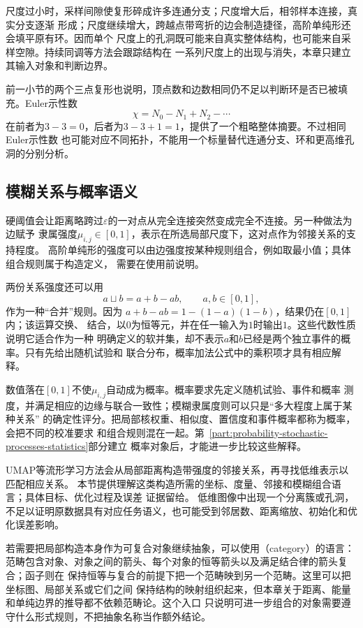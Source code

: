 尺度过小时，采样间隙使复形碎成许多连通分支；尺度增大后，相邻样本连接，真实分支逐渐
形成；尺度继续增大，跨越点带弯折的边会制造捷径，高阶单纯形还会填平原有环。因而单个
尺度上的孔洞既可能来自真实整体结构，也可能来自采样空隙。持续同调等方法会跟踪结构在
一系列尺度上的出现与消失，本章只建立其输入对象和判断边界。

前一小节的两个三点复形也说明，顶点数和边数相同仍不足以判断环是否已被填充。Euler示性数
\[
  \chi
  =
  N_0-N_1+N_2-\cdots
\]
在前者为$3-3=0$，后者为$3-3+1=1$，提供了一个粗略整体摘要。不过相同Euler示性数
也可能对应不同拓扑，不能用一个标量替代连通分支、环和更高维孔洞的分别分析。

\subsection{模糊关系与概率语义}

硬阈值会让距离略跨过$\varepsilon$的一对点从完全连接突然变成完全不连接。另一种做法为边赋予
隶属强度$\mu_{i,j}\in[0,1]$，表示在所选局部尺度下，这对点作为邻接关系的支持程度。
高阶单纯形的强度可以由边强度按某种规则组合，例如取最小值；具体组合规则属于构造定义，
需要在使用前说明。

两份关系强度还可以用
\begin{equation}
  a\mathbin{\sqcup}b
  =
  a+b-ab,
  \qquad
  a,b\in[0,1],
  \label{eq:geometry-fuzzy-union}
\end{equation}
作为一种“合并”规则。因为
$a+b-ab=1-(1-a)(1-b)$，结果仍在$[0,1]$内；该运算交换、
结合，以$0$为恒等元，并在任一输入为$1$时输出$1$。这些代数性质说明它适合作为一种
明确定义的软并集，却不表示$a$和$b$已经是两个独立事件的概率。只有先给出随机试验和
联合分布，概率加法公式中的乘积项才具有相应解释。

数值落在$[0,1]$不使$\mu_{i,j}$自动成为概率。概率要求先定义随机试验、事件和概率
测度，并满足相应的边缘与联合一致性；模糊隶属度则可以只是“多大程度上属于某种关系”
的确定性评分。把局部核权重、相似度、置信度和事件概率都称为概率，会把不同的校准要求
和组合规则混在一起。第~\ref{part:probability-stochastic-processes-statistics}部分建立
概率对象后，才能进一步比较这些解释。

UMAP等流形学习方法会从局部距离构造带强度的邻接关系，再寻找低维表示以匹配相应关系。
本节提供理解这类构造所需的坐标、度量、邻接和模糊组合语言；具体目标、优化过程及误差
证据留给。
低维图像中出现一个分离簇或孔洞，
不足以证明原数据具有对应任务语义，也可能受到邻居数、距离缩放、初始化和优化误差影响。

若需要把局部构造本身作为可复合对象继续抽象，可以使用（category）的语言：
范畴包含对象、对象之间的箭头、每个对象的恒等箭头以及满足结合律的箭头复合；函子则在
保持恒等与复合的前提下把一个范畴映到另一个范畴。这里可以把坐标图、局部关系或它们之间
保持结构的映射组织起来，但本章关于距离、能量和单纯边界的推导都不依赖范畴论。这个入口
只说明可进一步组合的对象需要遵守什么形式规则，不把抽象名称当作额外结论。

